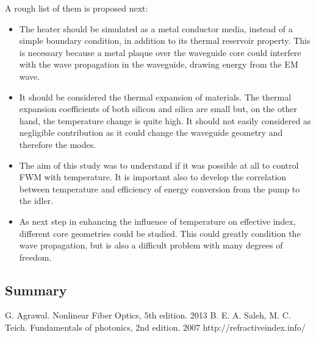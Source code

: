 \documentclass[12pt,a4paper,twoside]{article}
\begin{document}
A rough list of them is proposed next:
\begin{itemize}
\item	The heater should be simulated as a metal conductor media, instead of a simple boundary condition, in addition to its thermal reservoir property. This is necessary because a metal plaque over the waveguide core could interfere with the wave propagation in the waveguide, drawing energy from the EM wave.

\item	It should be considered the thermal expansion of materials.
The thermal expansion coefficients of both silicon and silica are small but, on the other hand, the temperature change is quite high.
It should not easily considered as negligible contribution as it could change the waveguide geometry and therefore the modes.

\item	The aim of this study was to understand if it was possible at all to control FWM with temperature.
It is important also to develop the correlation between temperature and efficiency of energy conversion from the pump to the idler.

\item	As next step in enhancing the influence of temperature on effective index, different core geometries could be studied.
This could greatly condition the wave propagation, but is also a difficult problem with many degrees of freedom.

\end{itemize}

\subsection{Summary}

\cleardoublepage
\begin{thebibliography}{9}
 G. Agrawal. Nonlinear Fiber Optics, 5th edition. 2013
 B. E. A. Saleh, M. C. Teich. Fundamentals of photonics, 2nd edition. 2007
 http://refractiveindex.info/
\end{thebibliography}
\end{document}
